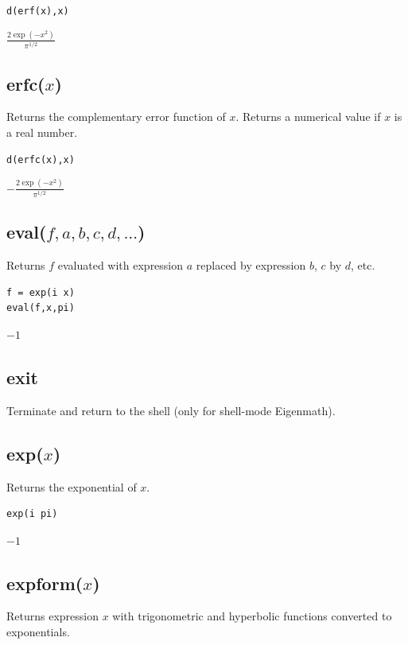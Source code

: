 {\color{blue}
\begin{verbatim}
d(erf(x),x)
\end{verbatim}
}

$\displaystyle \frac{2\exp(-x^2)}{\pi^{1/2}}$

\subsection*{erfc($x$)}

Returns the complementary error function of $x$.
Returns a numerical value if $x$ is a real number.

{\color{blue}
\begin{verbatim}
d(erfc(x),x)
\end{verbatim}
}

$\displaystyle -\frac{2\exp(-x^2)}{\pi^{1/2}}$

\subsection*{eval($f,a,b,c,d,\ldots$)}

Returns $f$ evaluated with expression $a$ replaced by expression $b$, $c$ by $d$, etc.

{\color{blue}
\begin{verbatim}
f = exp(i x)
eval(f,x,pi)
\end{verbatim}
}

$-1$

\subsection*{exit}

Terminate and return to the shell (only for shell-mode Eigenmath).

\subsection*{exp($x$)}

Returns the exponential of $x$.

{\color{blue}
\begin{verbatim}
exp(i pi)
\end{verbatim}
}

$-1$

\subsection*{expform($x$)}

Returns expression $x$ with trigonometric and hyperbolic functions
converted to exponentials.

